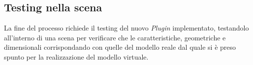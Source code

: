 \subsection{Testing nella scena}
La fine del processo richiede il testing del nuovo \emph{Plugin} implementato, testandolo all'interno
di una scena per verificare che le caratteristiche, geometriche e dimensionali corrispondando con quelle
del modello reale dal quale si è preso spunto per la realizzazione del modello virtuale.\\
